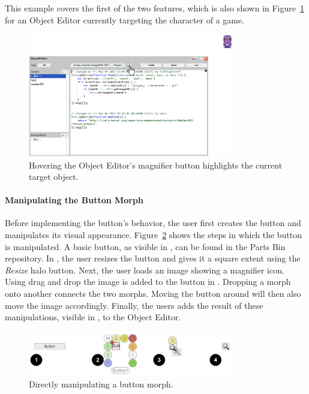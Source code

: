 This example covers the first of the two features, which is also shown in Figure~\ref{fig:MagnifierBehavior} for an Object Editor currently targeting the character of a game.

\begin{figure}[h]
    \centering
    \includegraphics[width=0.8\textwidth]{figures/3_motivation/2_magnifierBehavior.png}
    \caption{Hovering the Object Editor's magnifier button highlights the current target object.}
    \label{fig:MagnifierBehavior}
\end{figure}

\paragraph{Manipulating the Button Morph}
Before implementing the button's behavior, the user first creates the button and manipulates its visual appearance.
Figure~\ref{fig:ButtonBuilding} shows the steps in which the button is manipulated.
A basic button, as visible in , can be found in the Parts Bin repository.
In , the user resizes the button and gives it a square extent using the \emph{Resize} halo button.
Next, the user loads an image showing a magnifier icon.
Using drag and drop the image is added to the button in .
Dropping a morph onto another connects the two morphs.
Moving the button around will then also move the image accordingly.
Finally, the users adds the result of these manipulations, visible in , to the Object Editor.

\begin{figure}[h]
    \centering
    \includegraphics[width=0.8\textwidth]{figures/3_motivation/3_buildingTheButton.png}
    \caption{Directly manipulating a button morph.}
    \label{fig:ButtonBuilding}
\end{figure}

